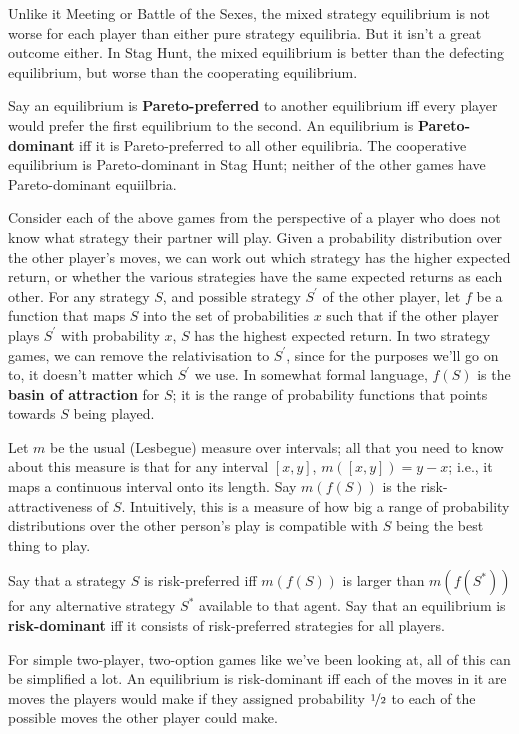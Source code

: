 \documentclass[openany]{book}
\begin{document}
Unlike it Meeting or Battle of the Sexes, the mixed strategy equilibrium is not worse for each player than either pure strategy equilibria. But it isn't a great outcome either. In Stag Hunt, the mixed equilibrium is better than the defecting equilibrium, but worse than the cooperating equilibrium. 

Say an equilibrium is \textbf{Pareto-preferred} to another equilibrium iff every player would prefer the first equilibrium to the second. An equilibrium is \textbf{Pareto-dominant} iff it is Pareto-preferred to all other equilibria. The cooperative equilibrium is Pareto-dominant in Stag Hunt; neither of the other games have Pareto-dominant equiilbria.

Consider each of the above games from the perspective of a player who does not know what strategy their partner will play. Given a probability distribution over the other player's moves, we can work out which strategy has the higher expected return, or whether the various strategies have the same expected returns as each other. For any strategy $S$, and possible strategy $S^\prime$ of the other player,  let $f$ be a function that maps $S$ into the set of probabilities $x$ such that if the other player plays $S^\prime$ with probability $x$, $S$ has the highest expected return. In two strategy games, we can remove the relativisation to $S^\prime$, since for the purposes we'll go on to, it doesn't matter which $S^\prime$ we use. In somewhat formal language, $f(S)$ is the \textbf{basin of attraction} for $S$; it is the range of probability functions that points towards $S$ being played.

Let $m$ be the usual (Lesbegue) measure over intervals; all that you need to know about this measure is that for any interval $[x, y]$, $m([x, y]) = y - x$; i.e., it maps a continuous interval onto its length. Say $m(f(S))$ is the risk-attractiveness of $S$. Intuitively, this is a measure of how big a range of probability distributions over the other person's play is compatible with $S$ being the best thing to play.

Say that a strategy $S$ is risk-preferred iff $m(f(S))$ is larger than $m(f(S^*))$ for any alternative strategy $S^*$ available to that agent. Say that an equilibrium is \textbf{risk-dominant} iff it consists of risk-preferred strategies for all players.

For simple two-player, two-option games like we've been looking at, all of this can be simplified a lot. An equilibrium is risk-dominant iff each of the moves in it are moves the players would make if they assigned probability $\nicefrac{1}{2}$ to each of the possible moves the other player could make.
\end{document}
